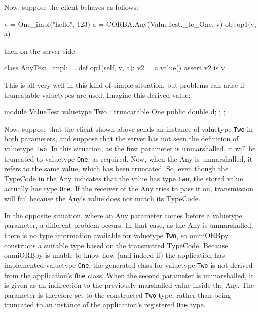 \documentclass[11pt,oneside,a4paper]{book}
\newcommand{\type}[1]{\texttt{#1}}
\begin{document}
\noindent Now, suppose the client behaves as follows:

\begin{pylisting}
v = One_impl("hello", 123)
a = CORBA.Any(ValueTest._tc_One, v)
obj.op1(v, a)
\end{pylisting}

\noindent then on the server side:

\begin{pylisting}
class AnyTest_impl:
    ...
    def op1(self, v, a):
        v2 = a.value()
        assert v2 is v
\end{pylisting}

\noindent
This is all very well in this kind of simple situation, but problems
can arise if truncatable valuetypes are used. Imagine this derived
value:

\begin{idllisting}
module ValueTest {
  valuetype Two : truncatable One {
    public double d;
  };
};
\end{idllisting}

\noindent
Now, suppose that the client shown above sends an instance of
valuetype \type{Two} in both parameters, and suppose that the server
has not seen the definition of valuetype \type{Two}. In this
situation, as the first parameter is unmarshalled, it will be
truncated to valuetype \type{One}, as required. Now, when the Any is
unmarshalled, it refers to the same value, which has been truncated.
So, even though the TypeCode in the Any indicates that the value has
type \type{Two}, the stored value actually has type \type{One}. If the
receiver of the Any tries to pass it on, transmission will fail
because the Any's value does not match its TypeCode.

In the opposite situation, where an Any parameter comes before a
valuetype parameter, a different problem occurs. In that case, as the
Any is unmarshalled, there is no type information available for
valuetype \type{Two}, so omniORBpy constructs a suitable type based on
the transmitted TypeCode. Because omniORBpy is unable to know how (and
indeed if) the application has implemented valuetype \type{One}, the
generated class for valuetype \type{Two} is not derived from the
application's \type{One} class. When the second parameter is
unmarshalled, it is given as an indirection to the
previously-marshalled value inside the Any. The parameter is therefore
set to the constructed \type{Two} type, rather than being truncated to
an instance of the application's registered \type{One} type.
\end{document}
